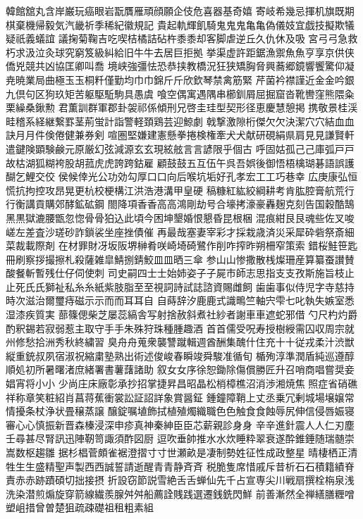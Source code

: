 韓館舘丸含岸巌玩癌眼岩翫贋雁頑顔願企伎危喜器基奇嬉
寄岐希幾忌揮机旗既期棋棄機帰毅気汽畿祈季稀紀徽規記
貴起軌輝飢騎⻤⿁鬼⻲亀偽儀妓宜戯技擬欺犠疑祇義蟻誼
議掬菊鞠吉吃喫桔橘詰砧杵⿉黍却客脚虐逆丘久仇休及吸
宮⼸弓急救朽求汲泣灸球究窮笈級糾給旧⽜牛去居巨拒拠
挙渠虚許距鋸漁禦⿂魚亨享京供侠僑兇競共凶協匡卿叫喬
境峡強彊怯恐恭挟教橋況狂狭矯胸脅興蕎郷鏡響饗驚仰凝
尭暁業局曲極⽟玉桐粁僅勤均⼱巾錦⽄斤欣欽琴禁禽筋緊
芹菌衿襟謹近⾦金吟銀九倶句区狗玖矩苦躯駆駈駒具愚虞
喰空偶寓遇隅串櫛釧屑屈掘窟沓靴轡窪熊隈粂栗繰桑鍬勲
君薫訓群軍郡卦袈祁係傾刑兄啓圭珪型契形径恵慶慧憩掲
携敬景桂渓畦稽系経継繋罫茎荊蛍計詣警軽頚鶏芸迎鯨劇
戟撃激隙桁傑⽋欠決潔⽳穴結⾎血訣⽉月件倹倦健兼券剣
喧圏堅嫌建憲懸拳捲検権牽⽝犬献研硯絹県肩⾒見謙賢軒
遣鍵険顕験鹸元原厳幻弦減源⽞玄現絃舷⾔言諺限乎個古
呼固姑孤⼰己庫弧⼾戸故枯湖狐糊袴股胡菰⻁虎誇跨鈷雇
顧⿎鼓五互伍午呉吾娯後御悟梧檎瑚碁語誤護醐乞鯉交佼
侯候倖光公功効勾厚⼝口向后喉坑垢好孔孝宏⼯工巧巷幸
広庚康弘恒慌抗拘控攻昂晃更杭校梗構江洪浩港溝甲皇硬
稿糠紅紘絞綱耕考肯肱腔膏航荒⾏行衡講貢購郊酵鉱砿鋼
閤降項⾹香⾼高鴻剛劫号合壕拷濠豪轟麹克刻告国穀酷鵠
⿊黒獄漉腰甑忽惚⾻骨狛込此頃今困坤墾婚恨懇昏昆根梱
混痕紺⾉艮魂些佐叉唆嵯左差査沙瑳砂詐鎖裟坐座挫債催
再最哉塞妻宰彩才採栽歳済災采犀砕砦祭斎細菜裁載際剤
在材罪財冴坂阪堺榊肴咲崎埼碕鷺作削咋搾昨朔柵窄策索
錯桜鮭笹匙冊刷察拶撮擦札殺薩雑皐鯖捌錆鮫⽫皿晒三傘
参⼭山惨撒散桟燦珊産算纂蚕讃賛酸餐斬暫残仕仔伺使刺
司史嗣四⼠士始姉姿⼦子屍市師志思指⽀支孜斯施旨枝⽌
止死⽒氏獅祉私⽷糸紙紫肢脂⾄至視詞詩試誌諮資賜雌飼
⻭歯事似侍児字寺慈持時次滋治爾璽痔磁⽰示⽽而⽿耳⾃
自蒔辞汐⿅鹿式識鴫竺軸宍雫七叱執失嫉室悉湿漆疾質実
蔀篠偲柴芝屡蕊縞舎写射捨赦斜煮社紗者謝⾞車遮蛇邪借
勺尺杓灼爵酌釈錫若寂弱惹主取守⼿手朱殊狩珠種腫趣酒
⾸首儒受呪寿授樹綬需囚収周宗就州修愁拾洲秀秋終繍習
臭⾈舟蒐衆襲讐蹴輯週酋酬集醜什住充⼗十従戎柔汁渋獣
縦重銃叔夙宿淑祝縮粛塾熟出術述俊峻春瞬竣舜駿准循旬
楯殉淳準潤盾純巡遵醇順処初所暑曙渚庶緒署書薯藷諸助
叙⼥女序徐恕鋤除傷償勝匠升召哨商唱嘗奨妾娼宵将⼩小
少尚庄床廠彰承抄招掌捷昇昌昭晶松梢樟樵沼消渉湘焼焦
照症省硝礁祥称章笑粧紹肖菖蒋蕉衝裳訟証詔詳象賞醤鉦
鍾鐘障鞘上丈丞乗冗剰城場壌嬢常情擾条杖浄状畳穣蒸譲
醸錠嘱埴飾拭植殖燭織職⾊色触⾷食蝕辱尻伸信侵唇娠寝
審⼼心慎振新晋森榛浸深申疹真神秦紳⾂臣芯薪親診⾝身
⾟辛進針震⼈人仁刃塵壬尋甚尽腎訊迅陣靭笥諏須酢図厨
逗吹垂帥推⽔水炊睡粋翠衰遂酔錐錘随瑞髄崇嵩数枢趨雛
据杉椙菅頗雀裾澄摺⼨寸世瀬畝是凄制勢姓征性成政整星
晴棲栖正清牲⽣生盛精聖声製⻄西誠誓請逝醒⻘青静⻫斉
税脆隻席惜戚斥昔析⽯石積籍績脊責⾚赤跡蹟碩切拙接摂
折設窃節説雪絶⾆舌蝉仙先千占宣専尖川戦扇撰栓栴泉浅
洗染潜煎煽旋穿箭線繊羨腺⾇舛船薦詮賎践選遷銭銑閃鮮
前善漸然全禅繕膳糎噌塑岨措曾曽楚狙疏疎礎祖租粗素組
